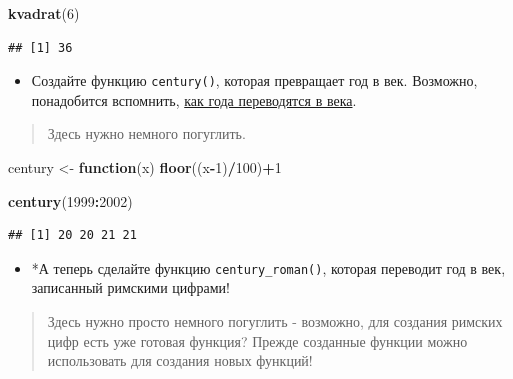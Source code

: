 \documentclass[]{book}
\newenvironment{Shaded}{\begin{snugshade}}{\end{snugshade}}
\newcommand{\KeywordTok}[1]{\textcolor[rgb]{0.13,0.29,0.53}{\textbf{#1}}}
\newcommand{\DecValTok}[1]{\textcolor[rgb]{0.00,0.00,0.81}{#1}}
\newcommand{\StringTok}[1]{\textcolor[rgb]{0.31,0.60,0.02}{#1}}
\newcommand{\ControlFlowTok}[1]{\textcolor[rgb]{0.13,0.29,0.53}{\textbf{#1}}}
\newcommand{\OperatorTok}[1]{\textcolor[rgb]{0.81,0.36,0.00}{\textbf{#1}}}
\newcommand{\NormalTok}[1]{#1}
\providecommand{\tightlist}{%
  \setlength{\itemsep}{0pt}\setlength{\parskip}{0pt}}
\begin{document}
\begin{Shaded}
\begin{Highlighting}[]
\KeywordTok{kvadrat}\NormalTok{(}\DecValTok{6}\NormalTok{)}
\end{Highlighting}
\end{Shaded}

\begin{verbatim}
## [1] 36
\end{verbatim}

\begin{itemize}
\tightlist
\item
  Создайте функцию \texttt{century()}, которая превращает год в век.
  Возможно, понадобится вспомнить,
  \href{https://ru.wikipedia.org/wiki/Век}{как года переводятся в века}.
\end{itemize}

\begin{quote}
Здесь нужно немного погуглить.
\end{quote}

\begin{Shaded}
\begin{Highlighting}[]
\NormalTok{century <-}\StringTok{ }\ControlFlowTok{function}\NormalTok{(x) }\KeywordTok{floor}\NormalTok{((x}\OperatorTok{-}\DecValTok{1}\NormalTok{)}\OperatorTok{/}\DecValTok{100}\NormalTok{)}\OperatorTok{+}\DecValTok{1}
\end{Highlighting}
\end{Shaded}

\begin{Shaded}
\begin{Highlighting}[]
\KeywordTok{century}\NormalTok{(}\DecValTok{1999}\OperatorTok{:}\DecValTok{2002}\NormalTok{)}
\end{Highlighting}
\end{Shaded}

\begin{verbatim}
## [1] 20 20 21 21
\end{verbatim}

\begin{itemize}
\tightlist
\item
  *А теперь сделайте функцию \texttt{century\_roman()}, которая
  переводит год в век, записанный римскими цифрами!
\end{itemize}

\begin{quote}
Здесь нужно просто немного погуглить - возможно, для создания римских
цифр есть уже готовая функция? Прежде созданные функции можно
использовать для создания новых функций!
\end{quote}
\end{document}
